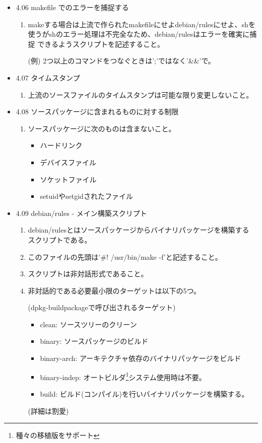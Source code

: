 \documentclass[mingoth,a4paper]{jsarticle}
\begin{document}
\begin{itemize}
\item 4.06 makefile でのエラーを捕捉する
  \begin{enumerate}
  \item makeする場合は上流で作られたmakefileにせよdebian/rulesにせよ、shを
    使うがshのエラー処理は不完全なため、debian/rulesはエラーを確実に捕捉
    できるようスクリプトを記述すること。

    (例) 2つ以上のコマンドをつなぐときは';'ではなく'\&\&'で。
  \end{enumerate}

\item 4.07 タイムスタンプ
  \begin{enumerate}
  \item 上流のソースファイルのタイムスタンプは可能な限り変更しないこと。
  \end{enumerate}

\item 4.08 ソースパッケージに含まれるものに対する制限
  \begin{enumerate}
  \item ソースパッケージに次のものは含まないこと。
    \begin{itemize}
    \item ハードリンク
    \item デバイスファイル
    \item ソケットファイル
    \item setuidやsetgidされたファイル
    \end{itemize}
  \end{enumerate}

\item 4.09 debian/rules - メイン構築スクリプト
  \begin{enumerate}
  \item debian/rulesとはソースパッケージからバイナリパッケージを構築する
    スクリプトである。
  \item  このファイルの先頭は'\#! /usr/bin/make -f'と記述すること。
  \item  スクリプトは非対話形式であること。
  \item  非対話的である必要最小限のターゲットは以下の5つ。

    (dpkg-buildpackageで呼び出されるターゲット)
    \begin{itemize}
    \item clean: ソースツリーのクリーン
    \item binary: ソースパッケージのビルド
    \item binary-arch: アーキテクチャ依存のバイナリパッケージをビルド
    \item binary-indep: オートビルダ\footnote{種々の移植版をサポート}システム使用時は不要。
    \item build: ビルド(コンパイル)を行いバイナリパッケージを構築する。
    \end{itemize}
    (詳細は割愛)
  \end{enumerate}


\end{itemize}
\end{document}
